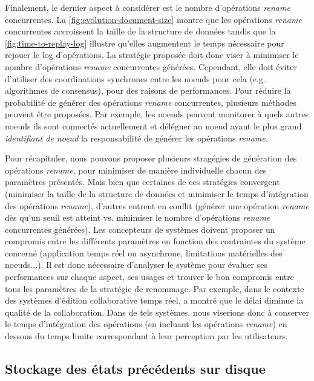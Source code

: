 \documentclass[12pt]{thesul}
\newcommand{\eg}{e.g. }
\begin{document}
Finalement, le dernier aspect à considérer est le nombre d'opérations \emph{rename} concurrentes.
La \autoref{fig:evolution-document-size} montre que les opérations \emph{rename} concurrentes accroissent la taille de la structure de données tandis que la \autoref{fig:time-to-replay-log} illustre qu'elles augmentent le temps nécessaire pour rejouer le log d'opérations.
La stratégie proposée doit donc viser à minimiser le nombre d'opérations \emph{rename} concurrentes générées.
Cependant, elle doit éviter d'utiliser des coordinations synchrones entre les noeuds pour cela (\eg algorithmes de consensus), pour des raisons de performances.
Pour réduire la probabilité de générer des opérations \emph{rename} concurrentes, plusieurs méthodes peuvent être proposées.
Par exemple, les noeuds peuvent monitorer à quels autres noeuds ils sont connectés actuellement et déléguer au noeud ayant le plus grand \emph{identifiant de noeud} la responsabilité de générer les opérations \emph{rename}.

Pour récapituler, nous pouvons proposer plusieurs stragégies de génération des opérations \emph{rename}, pour minimiser de manière individuelle chacun des paramètres présentés.
Mais bien que certaines de ces stratégies convergent (minimiser la taille de la structure de données et minimiser le temps d'intégration des opérations \emph{rename}), d'autres entrent en conflit (générer une opération \emph{rename} dès qu'un seuil est atteint vs. minimiser le nombre d'opérations \emph{rename} concurrentes générées).
Les concepteurs de systèmes doivent proposer un compromis entre les différents paramètres en fonction des contraintes du système concerné (application temps réel ou asynchrone, limitations matérielles des noeuds...).
Il est donc nécessaire d'analyser le système pour évaluer ses performances sur chaque aspect, ses usages et trouver le bon compromis entre tous les paramètres de la stratégie de renommage.
Par exemple, dans le contexte des systèmes d'édition collaborative temps réel, \cite{ignat:hal-01088815} a montré que le délai diminue la qualité de la collaboration.
Dans de tels systèmes, nous viserions donc à conserver le temps d'intégration des opérations (en incluant les opérations \emph{rename}) en dessous du temps limite correspondant à leur perception par les utilisateurs.

\subsection{Stockage des états précédents sur disque}
\end{document}
